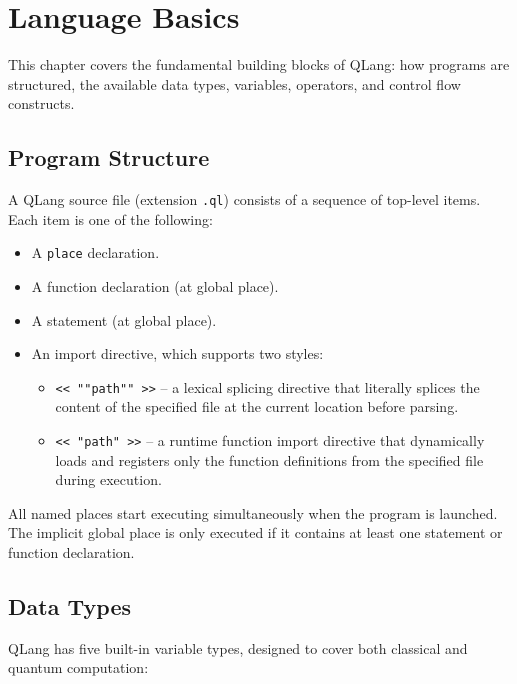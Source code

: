 \section{Language Basics}\label{sec:language-basics}

This chapter covers the fundamental building blocks of QLang: how programs are
structured, the available data types, variables, operators, and control flow
constructs.

\subsection{Program Structure}\label{sec:program-structure}

A QLang source file (extension \texttt{.ql}) consists of a sequence of
top-level items. Each item is one of the following:

\begin{itemize}
    \item A \texttt{place} declaration.
    \item A function declaration (at global place).
    \item A statement (at global place).
    \item An import directive, which supports two styles:
          \begin{itemize}
              \item \texttt{<< \texttt{""path""} >>} -- a lexical splicing directive that literally splices the content of the specified file at the current location before parsing.
              \item \texttt{<< \texttt{"path"} >>} -- a runtime function import directive that dynamically loads and registers only the function definitions from the specified file during execution.
          \end{itemize}
\end{itemize}

All named places start executing simultaneously when the program is launched.
The implicit global place is only
executed if it contains at least one statement or function declaration.



\subsection{Data Types}\label{sec:data-types}

QLang has five built-in variable types, designed to cover both classical and
quantum computation:

